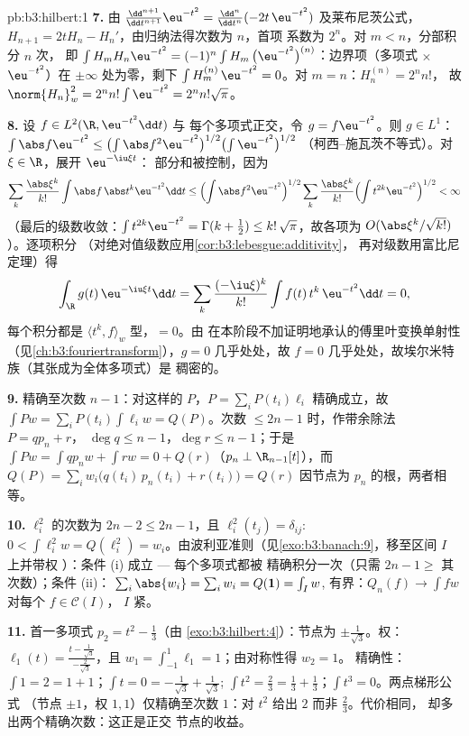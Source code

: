 \begin{solution}{pb:b3:hilbert:1}
\textbf{7.} 由 $\frac{\dd^{n+1}}{\dd t^{n+1}}\eu^{-t^2} =
\frac{\dd^n}{\dd t^n}(-2t\,\eu^{-t^2})$ 及莱布尼茨公式，$H_{n+1}
= 2tH_n - H_n'$，由归纳法得次数为 $n$，首项
系数为 $2^n$。对 $m < n$，分部积分 $n$ 次，
即 $\int H_m H_n\eu^{-t^2} = (-1)^n\int H_m\,\bigl(\eu^{-t^2}
\bigr)^{(n)}$：边界项（多项式 $\times$
$\eu^{-t^2}$）在 $\pm\infty$ 处为零，剩下 $\int
H_m^{(n)}\,\eu^{-t^2} = 0$。对 $m = n$：$H_n^{(n)} = 2^nn!$，
故 $\norm{H_n}_w^2 = 2^nn!\int\eu^{-t^2} = 2^nn!\sqrt\pi$。

\textbf{8.} 设 $f \in L^2(\R, \eu^{-t^2}\dd t)$ 与
每个多项式正交，令 $g = f\eu^{-t^2}$。则 $g \in
L^1$：$\int\abs f\eu^{-t^2} \leq \bigl(\int\abs
f^2\eu^{-t^2}\bigr)^{1/2}\bigl(\int\eu^{-t^2}\bigr)^{1/2}$
（柯西--施瓦茨不等式）。对 $\xi \in \R$，展开 $\eu^{-\iu\xi t}$：
部分和被控制，因为
\[
\sum_k\frac{\abs\xi^k}{k!}\int\abs f\,\abs t^k\eu^{-t^2}\dd t
\leq \Bigl(\int \abs f^2\eu^{-t^2}\Bigr)^{1/2}
\sum_k\frac{\abs\xi^k}{k!}\Bigl(\int
t^{2k}\eu^{-t^2}\Bigr)^{1/2} < \infty
\]
（最后的级数收敛：$\int t^{2k}\eu^{-t^2} =
\Gamma(k+\frac12) \leq k!\,\sqrt\pi$，故各项为
$O(\abs\xi^k/\sqrt{k!})$）。逐项积分
（对绝对值级数应用\cref{cor:b3:lebesgue:additivity}，
再对级数用富比尼定理）得
\[
\int_\R g(t)\,\eu^{-\iu\xi t}\dd t
= \sum_k\frac{(-\iu\xi)^k}{k!}\int f(t)\,t^k\,\eu^{-t^2}\dd t
= 0 ,
\]
每个积分都是 $\langle t^k, f\rangle_w$ 型，$= 0$。由
在本阶段不加证明地承认的傅里叶变换单射性
（见\cref{ch:b3:fouriertransform}），$g = 0$ 几乎处处，故 $f = 0$
几乎处处，故埃尔米特族（其张成为全体多项式）是
稠密的。

\textbf{9.} 精确至次数 $n - 1$：对这样的 $P$，$P =
\sum_iP(t_i)\ell_i$ 精确成立，故 $\int Pw = \sum_iP(t_i)\int
\ell_iw = Q(P)$。次数 $\leq 2n - 1$ 时，作带余除法 $P = qp_n + r$，
$\deg q \leq n - 1$，$\deg r \leq n-1$；于是 $\int Pw = \int
qp_nw + \int rw = 0 + Q(r)$（$p_n \perp \R_{n-1}[t]$），而
$Q(P) = \sum_iw_i\bigl(q(t_i)\,p_n(t_i) + r(t_i)\bigr) = Q(r)$
因节点为 $p_n$ 的根，两者相等。

\textbf{10.} $\ell_i^2$ 的次数为 $2n - 2 \leq 2n - 1$，且
$\ell_i^2(t_j) = \delta_{ij}$: $0 < \int\ell_i^2w = Q(\ell_i^2)
= w_i$。由波利亚准则（见\cref{exo:b3:banach:9}，移至区间 $I$ 上并带权
）：条件 (i) 成立 --- 每个多项式都被
精确积分一次（只需 $2n - 1 \geq$ 其次数）；条件 (ii)：
$\sum_i\abs{w_{i}} = \sum_iw_i = Q(\mathbf 1) = \int_Iw$,
有界：$Q_n(f) \to \int fw$ 对每个 $f \in \mathcal C(I)$，
$I$ 紧。

\textbf{11.} 首一多项式 $p_2 = t^2 - \frac13$（由
\cref{exo:b3:hilbert:4}）：节点为 $\pm\frac1{\sqrt3}$。权：
$\ell_1(t) = \frac{t - \frac1{\sqrt3}}{-\frac2{\sqrt3}}$，且
$w_1 = \int_{-1}^1\ell_1 = 1$；由对称性得 $w_2 = 1$。
精确性：$\int 1 = 2 = 1 + 1$；$\int t = 0 =
-\frac1{\sqrt3} + \frac1{\sqrt3}$; $\int t^2 = \frac23 =
\frac13 + \frac13$；$\int t^3 = 0$。两点梯形公式
（节点 $\pm1$，权 $1, 1$）仅精确至次数
$1$：对 $t^2$ 给出 $2$ 而非 $\frac23$。代价相同，
却多出两个精确次数：这正是正交
节点的收益。


\end{solution}
